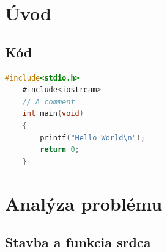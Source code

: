 \chapter*{Úvod}
\setcounter{page}{1}

\begin{chapterabstract}
	\lipsum[1]
\end{chapterabstract}

\lipsum[4]

\section{Kód}

\vspace{\baselineskip} 
\begin{lstlisting}[caption={~Zbytočný kód},label=list:8-6,captionpos=t,abovecaptionskip=-\medskipamount,belowcaptionskip=\medskipamount,language=C]
    #include<stdio.h>
    #include<iostream>
    // A comment
    int main(void)
    {
        printf("Hello World\n");
        return 0;
    }
\end{lstlisting}



\chapter{Analýza problému}

\section{Stavba a funkcia srdca}

